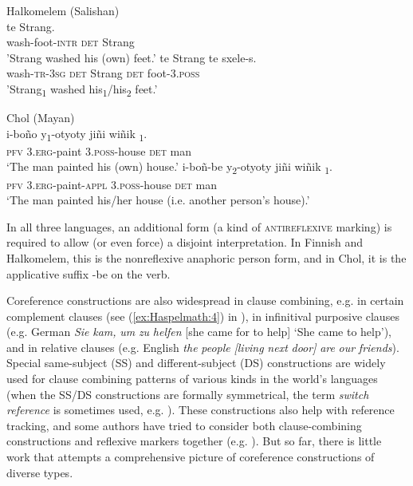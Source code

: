 \documentclass[output=paper]{langscibook}
\begin{document}
\ea%
   Halkomelem (Salishan) \label{ex:Haspelmath:53}\\
    \ea 
      {te}  {Strang.}\\
      wash-foot-\textsc{intr}  \textsc{det}  Strang  \\
    \glt’Strang washed his (own) feet.’
    \ex 
      {te}  {Strang}  {te}  {sxele-s.}\\
      wash-\textsc{tr-3sg}  \textsc{det}  Strang  \textsc{det}  foot-\textsc{3.poss}\\
      \glt ’Strang\textsubscript{1} washed his\textsubscript{1}/his\textsubscript{2} feet.’
    \z
\z 

\ea%
    Chol (Mayan)\label{ex:Haspelmath:54}\\
    \ea 
      {i-boño}  {y\textsubscript{1}-otyoty}  jiñi  wiñik {\textsubscript{1}}.\\
      \textsc{pfv}  3.\textsc{erg}{}-paint  3.\textsc{poss}{}-house  \textsc{det}  man   \\
    \glt‘The man painted his (own) house.’
    \ex 
      {i-boñ-be}  {y\textsubscript{2}-otyoty}  jiñi  wiñik {\textsubscript{1}}.\\
      \textsc{pfv}  3.\textsc{erg}{}-paint-\textsc{appl}  3.\textsc{poss}{}-house  \textsc{det}  man\\
    \glt ‘The man painted his/her house (i.e. another person’s house).’
    \z
\z 


In all three languages, an additional form (a kind of \textsc{antireflexive} marking) is required to allow (or even force) a disjoint interpretation. In Finnish and Halkomelem, this is the nonreflexive anaphoric person form, and in Chol, it is the applicative suffix {{}-be} on the verb.

 Coreference constructions are also widespread in clause combining, e.g. in certain complement clauses (see (\ref{ex:Haspelmath:4}) in ), in infinitival purposive clauses (e.g. German \textit{Sie} \textit{kam,} \textit{um} \textit{zu} \textit{helfen} [she came for to help] ‘She came to help’), and in relative clauses (e.g. English \textit{the} \textit{people} \textit{[living} \textit{next} \textit{door]} \textit{are} \textit{our} \textit{friends}). Special same-subject (SS) and different-subject (DS) constructions are widely used for clause combining patterns of various kinds in the world’s languages (when the SS/DS constructions are formally symmetrical, the term \textit{switch} \textit{reference} is sometimes used, e.g. \citealt{Vangijn2016}). These constructions also help with reference tracking, and some authors have tried to consider both clause-combining constructions and reflexive markers together (e.g. \citealt{Matić2014} ). But so far, there is little work that attempts a comprehensive picture of coreference constructions of diverse types.
\end{document}
